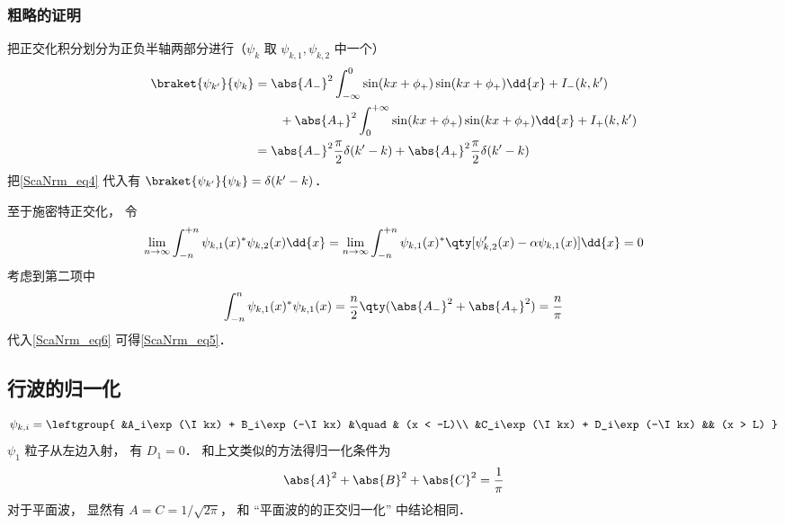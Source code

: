 \subsubsection{粗略的证明}
把正交化积分划分为正负半轴两部分进行（$\psi_{k}$ 取 $\psi_{k,1}, \psi_{k,2}$ 中一个）
\begin{equation}
\begin{aligned}
\braket{\psi_{k'}}{\psi_{k}} &= \abs{A_-}^2\int_{-\infty}^0 \sin(kx + \phi_{+})\sin(kx + \phi_{+}) \dd{x} + I_-(k,k')\\
&\qquad+ \abs{A_+}^2\int_0^{+\infty} \sin(kx + \phi_{+})\sin(kx + \phi_{+}) \dd{x}   + I_+(k,k')\\
&= \abs{A_-}^2\frac{\pi}{2}\delta(k'-k) + \abs{A_+}^2 \frac{\pi}{2} \delta(k'-k)
\end{aligned}
\end{equation}
把\autoref{ScaNrm_eq4} 代入有 $\braket{\psi_{k'}}{\psi_{k}} = \delta(k'-k)$．

至于施密特正交化， 令
\begin{equation}\label{ScaNrm_eq6}
\lim_{n\to\infty}\int_{-n}^{+n} \psi_{k,1}(x)^*\psi_{k,2}(x)\dd{x} = \lim_{n\to\infty}\int_{-n}^{+n} \psi_{k,1}(x)^*\qty[\psi'_{k,2}(x) - \alpha \psi_{k,1}(x)]\dd{x} = 0
\end{equation}
考虑到第二项中
\begin{equation}
\int_{-n}^n \psi_{k,1}(x)^*\psi_{k,1}(x) = \frac{n}{2}\qty(\abs{A_-}^2 + \abs{A_+}^2) = \frac{n}{\pi}
\end{equation}
代入\autoref{ScaNrm_eq6} 可得\autoref{ScaNrm_eq5}．

\subsection{行波的归一化}

\begin{equation}
\psi_{k,i} = \leftgroup{
    &A_i\exp(\I kx) + B_i\exp(-\I kx) &\quad& (x < -L)\\
    &C_i\exp(\I kx) + D_i\exp(-\I kx) && (x > L)
}
\end{equation}
$\psi_1$ 粒子从左边入射， 有 $D_1 = 0$． 和上文类似的方法得归一化条件为
\begin{equation}
\abs{A}^2 + \abs{B}^2 + \abs{C}^2 = \frac{1}{\pi}
\end{equation}
对于平面波， 显然有 $A = C = 1/\sqrt{2\pi}$， 和 “平面波的的正交归一化” 中结论相同．
